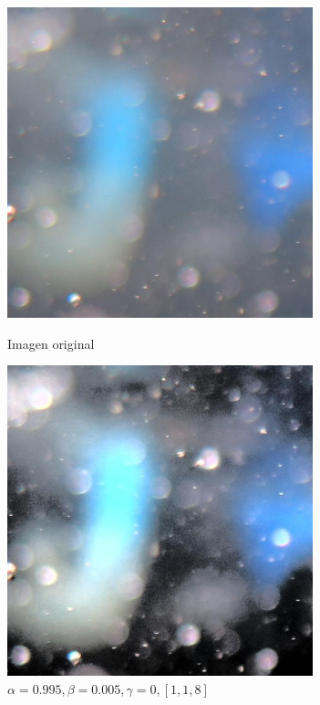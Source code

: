 
\begin{figure}[H]
\begin{minipage}[c]{0.48\linewidth}
  \includegraphics[height=9cm]{imgs/1923xx.pdf}
  \caption{Imagen original}
\end{minipage}
\hfill
\begin{minipage}[c]{0.48\linewidth}
  \includegraphics[height=9cm]{imgs/1923xxOut.pdf}
    \caption{$\alpha = 0.995, \beta = 0.005, \gamma = 0, [1, 1, 8]$}
\end{minipage}%
\end{figure}

